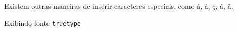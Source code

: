 \documentclass{article}
\begin{document}
Existem outras maneiras de inserir caracteres especiais, como \'{a}, \`{a}, \c{c}, \^{a}, \~{a}.

Exibindo fonte \texttt{truetype}
\end{document}
